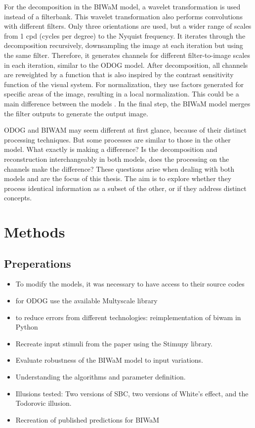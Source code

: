 For the decomposition in the BIWaM model, a wavelet transformation is used instead of a
filterbank. This wavelet transformation also performs convolutions with different filters.
Only three orientations are used, but a wider range of scales from 1 cpd (cycles per
degree) to the Nyquist frequency. It iterates through the decomposition recursively,
downsampling the image at each iteration but using the same filter. Therefore, it
generates channels for different filter-to-image scales in each iteration, similar to the
ODOG model. After decomposition, all channels are reweighted by a function that is also
inspired by the contrast sensitivity function of the visual system. For normalization,
they use factors generated for specific areas of the image, resulting in a local
normalization. This could be a main difference between the models \parencite{Betz2015}. In
the final step, the BIWaM model merges the filter outputs to generate the output image.


ODOG and BIWAM may seem different at first glance, because of their distinct processing
techniques. But some processes are similar to those in the other model. What exactly is
making a difference? Is the decomposition and reconstruction interchangeably in both
models, does the processing on the channels make the difference? These questions arise
when dealing with both models and are the focus of this thesis.  The aim is to explore
whether they process identical information as a subset of the other, or if they address
distinct concepts.

\newpage


\section{Methods}  %

\subsection*{Preperations}

\begin{itemize}
    \item To modify the models, it was necessary to have access to their source codes
    \item for ODOG use the available Multyscale library
    \item to reduce errors from different technologies: reimplementation of biwam in Python
    \item Recreate input stimuli from the paper using the Stimupy library.
    \item Evaluate robustness of the BIWaM model to input variations.
    \item Understanding the algorithms and parameter definition.
    \item Illusions tested: Two versions of SBC, two versions of White’s effect, and the Todorovic illusion.
    \item Recreation of published predictions for BIWaM
\end{itemize}

